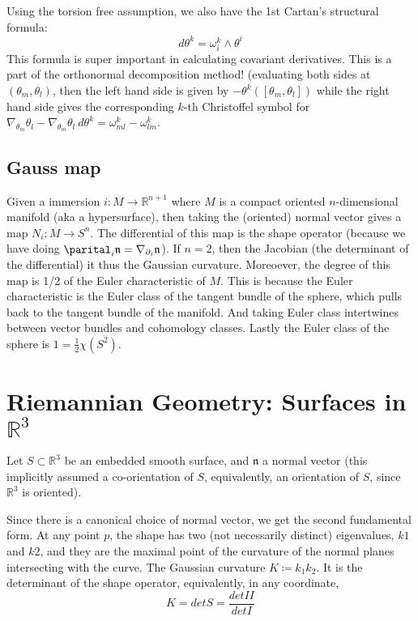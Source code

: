 \documentclass[main.tex]{subfiles}
\begin{document}
Using the torsion free assumption, we also have the 1st Cartan's structural formula:
$$
d\theta^k = \omega_i ^k \wedge \theta^i
$$
This formula is super important in calculating covariant derivatives. This is a part of the orthonormal decomposition method!
(evaluating both sides at $(\theta_m, \theta_l)$, then the left hand side is given by $-\theta^k([\theta_m, \theta_l])$ while the right hand side gives the corresponding $k$-th Christoffel symbol for $\nabla_{\theta_m} \theta_l - \nabla_{\theta_m}\theta_l \ d\theta^k= \omega^k _{ml} - \omega^k _{lm}$.

\subsection{Gauss map}
Given a immersion $i: M \rightarrow \mathbb{R}^{n+1}$ where $M$ is a compact oriented $n$-dimensional manifold (aka a hypersurface), then taking the (oriented) normal vector gives a map $N_i: M \rightarrow S^n$. The differential of this map is the shape operator (because we have doing $\parital_i \mathfrak{n} = \nabla_{\partial_i} \mathfrak{n}$). 
If $n=2$, then the Jacobian (the determinant of the differential) it thus the Gaussian curvature. 
Moreoever, the degree of this map is 1/2 of the Euler characteristic of $M$. This is because the Euler characteristic is the Euler class of the tangent bundle of the sphere, which pulls back to the tangent bundle of the manifold. And taking Euler class intertwines between vector bundles and cohomology classes. Lastly the Euler class of the sphere is $1 = \frac{1}{2} \chi(S^2)$.


\section{Riemannian Geometry: Surfaces in $\mathbb{R}^3$}

Let $S \subset \mathbb{R}^3$ be an embedded smooth surface, and $\mathfrak{n}$ a normal vector (this implicitly assumed a co-orientation of $S$, equivalently, an orientation of $S$, since $\mathbb{R}^3$ is oriented).

Since there is a canonical choice of normal vector, we get the second fundamental form. At any point $p$, the shape has two (not necessarily distinct) eigenvalues, $k1$ and $k2$, and they are the maximal point of the curvature of the normal planes intersecting with the curve. The Gaussian curvature $K \coloneqq k_1 k_2$. It is the determinant of the shape operator, equivalently, in any coordinate, 
$$
K = det S = \frac{det II}{det I}
$$
\end{document}
